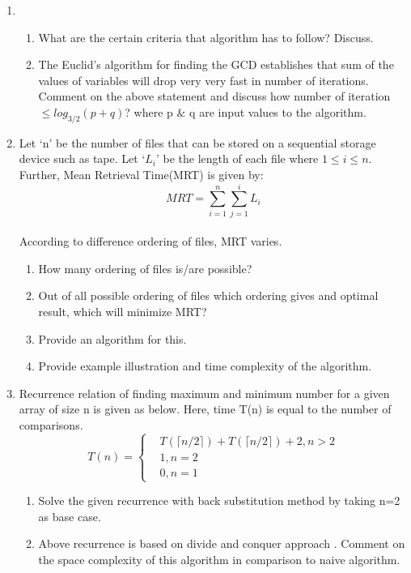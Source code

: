 \documentclass{exmppr}
\begin{document}
\begin{enumerate}

\item \begin{enumerate}
\item What are the certain criteria that algorithm has to follow? Discuss.

\item The Euclid's algorithm for finding the GCD establishes that sum of the values of variables will drop very very fast in number of iterations.\\
Comment on the above statement and discuss how number of iteration $\leq log_{3/2}(p+q)$? where p $\&$ q are input values to the algorithm.

\end{enumerate}
\item Let `n' be the number of files that can be stored on a sequential storage device such as tape. Let `$L_i$' be the length of each file where $1 \leq i \leq n$. Further, Mean Retrieval Time(MRT) is given by:\\
{\centering $$MRT = \sum_{i=1}^{n}\sum_{j=1}^{i} L_i$$}\\
According to difference ordering of files, MRT varies.
\begin{enumerate} 
\item How many ordering of files is/are possible?
\item Out of all possible ordering of files which ordering gives and optimal result, which will minimize MRT?
\item Provide an algorithm for this.
\item Provide example illustration and time complexity of the algorithm.
\end{enumerate}
\item Recurrence relation of finding maximum and minimum number for a given array of size n is given as below. 
Here, time T(n) is equal to the number of comparisons.\\
{\centering $$
  T(n) = \left \{
  \begin{aligned}
    &T(\lceil n/2 \rceil) + T(\lceil n/2 \rceil) + 2, n > 2 \\
    &1, n = 2\\
    &0, n = 1
  \end{aligned} \right.
$$}
\begin{enumerate}
\item Solve the given recurrence with back substitution method by taking n=2 as base case.
\item Above recurrence is based on divide and conquer approach . Comment on the space complexity of this algorithm in comparison to naive algorithm.
\end{enumerate}


\end{enumerate}
\end{document}
